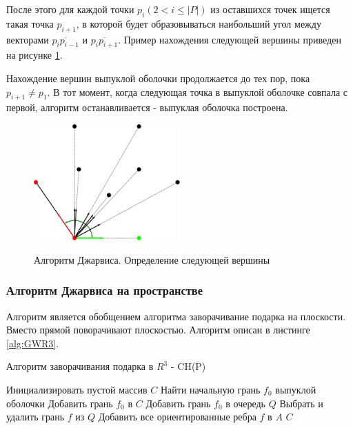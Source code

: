 \documentclass[a4paper,14pt]{extarticle}  %
\begin{document}
После этого для каждой точки $p_i \left(2 < i\leq|P|\right)$ из оставшихся точек ищется такая точка $p_{i+1}$, в которой будет образовываться наибольший угол между векторами $\overline{p_ip_{i-1}}$ и $\overline{p_ip_{i+1}}$. Пример нахождения следующей вершины приведен на рисунке \ref{fig:gw2}.

Нахождение вершин выпуклой оболочки продолжается до тех пор, пока $p_{i+1}\neq p_1$. В тот момент, когда следующая точка в выпуклой оболочке совпала с первой, алгоритм останавливается - выпуклая оболочка построена.

\begin{figure}[t]
\centering

  \includegraphics[width=0.5\textwidth]{giftW2d.pdf}~%

 \caption{Алгоритм Джарвиса. Определение следующей вершины}
 \label{fig:gw2}
\end{figure}


\subsubsection{Алгоритм Джарвиса на пространстве}\label{sec:gw3d}
Алгоритм является обобщением алгоритма заворачивание подарка на плоскости. Вместо прямой поворачивают плоскостью. Алгоритм описан в листинге \ref{alg:GWR3}.


\begin{algorithm*}[H]
    \caption{Алгоритм заворачивания подарка в $R^3$ - CH(P)}
    \label{alg:GWR3}
    \DontPrintSemicolon
    Инициализировать пустой массив $C$\;
    Найти начальную грань $f_0$ выпуклой оболочки\;
    Добавить грань $f_0$ в $C$ \;
    Добавить грань $f_0$ в очередь $Q$\;
    {
        Выбрать и удалить грань $f$ из $Q$\;
        Добавить все ориентированные ребра $f$ в $A$\;
    }
    \Return $C$
\end{algorithm*}
\end{document}
